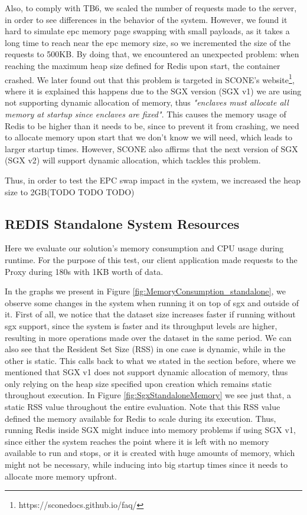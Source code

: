 Also, to comply with TB6, we scaled the number of requests made to the server, in order to see differences in the behavior of the system. However, we found it hard to simulate \gls{epc} memory page swapping with small payloads, as it takes a long time to reach near the \gls{epc} memory size, so we incremented the size of the requests to 500KB. By doing that, we encountered an unexpected problem: when reaching the maximum heap size defined for Redis upon start, the container crashed. We later found out that this problem is targeted in SCONE's website\footnote{https://sconedocs.github.io/faq/}, where it is explained this happens due to the SGX version (SGX v1) we are using not supporting dynamic allocation of memory, thus \textit{"enclaves must allocate all memory at startup since enclaves are fixed"}. This causes the memory usage of Redis to be higher than it needs to be, since to prevent it from crashing, we need to allocate memory upon start that we don't know we will need, which leads to larger startup times. However, SCONE also affirms that the next version of SGX (SGX v2) will support dynamic allocation, which tackles this problem. 

Thus, in order to test the EPC swap impact in the system, we increased the heap size to 2GB(TODO TODO TODO)


\subsection{REDIS Standalone System Resources}

Here we evaluate our solution's memory consumption and CPU usage during runtime. 
For the purpose of this test, our client application made requests to the Proxy during 180s with 1KB worth of data.  

In the graphs we present in Figure \ref{fig:MemoryConsumption_standalone}, we observe some changes in the system when running it on top of \gls{sgx} and outside of it. First of all, we notice that the dataset size increases faster if running without \gls{sgx} support, since the system is faster and its throughput levels are higher, resulting in more operations made over the dataset in the same period. We can also see that the Resident Set Size (RSS) in one case is dynamic, while in the other is static. This calls back to what we stated in the section before, where we mentioned that SGX v1 does not support dynamic allocation of memory, thus only relying on the heap size specified upon creation which remains static throughout execution. In Figure \ref{fig:SgxStandaloneMemory} we see just that, a static RSS value throughout the entire evaluation. Note that this RSS value defined the memory available for Redis to scale during its execution. Thus, running Redis inside SGX might induce into memory problems if using SGX v1, since either the system reaches the point where it is left with no memory available to run and stops, or it is created with huge amounts of memory, which might not be necessary, while inducing into big startup times since it needs to allocate more memory upfront.

